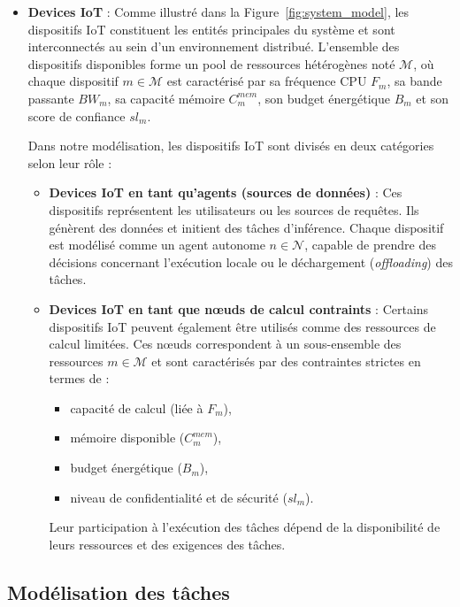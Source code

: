 \documentclass[12pt,a4paper]{report}
\begin{document}
\begin{itemize}
    \item \textbf{Devices IoT} :
    Comme illustré dans la Figure~\ref{fig:system_model}, les dispositifs IoT constituent les entités principales du système et sont interconnectés au sein d’un environnement distribué.  
    L’ensemble des dispositifs disponibles forme un pool de ressources hétérogènes noté $\mathcal{M}$, où chaque dispositif $m \in \mathcal{M}$ est caractérisé par sa fréquence CPU $F_m$, sa bande passante $BW_m$, sa capacité mémoire $C^{mem}_m$, son budget énergétique $B_m$ et son score de confiance $sl_m$.
    
    Dans notre modélisation, les dispositifs IoT sont divisés en deux catégories selon leur rôle :

    \begin{itemize}
        \item \textbf{Devices IoT en tant qu’agents (sources de données)} :  
        Ces dispositifs représentent les utilisateurs ou les sources de requêtes. Ils génèrent des données et initient des tâches d’inférence. 
        Chaque dispositif est modélisé comme un agent autonome $n \in \mathcal{N}$, capable de prendre des décisions concernant l’exécution locale ou le déchargement (\textit{offloading}) des tâches.

        \item \textbf{Devices IoT en tant que nœuds de calcul contraints} :  
        Certains dispositifs IoT peuvent également être utilisés comme des ressources de calcul limitées. 
        Ces nœuds correspondent à un sous-ensemble des ressources $m \in \mathcal{M}$ et sont caractérisés par des contraintes strictes en termes de :
        \begin{itemize}
            \item capacité de calcul (liée à $F_m$),
            \item mémoire disponible ($C^{mem}_m$),
            \item budget énergétique ($B_m$),
            \item niveau de confidentialité et de sécurité ($sl_m$).
        \end{itemize}
        Leur participation à l’exécution des tâches dépend de la disponibilité de leurs ressources et des exigences des tâches.
    \end{itemize}
\end{itemize}

\subsection{Modélisation des tâches}
\end{document}
